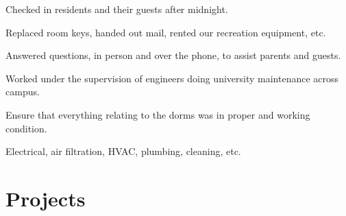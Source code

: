 \documentclass[]{latex/resume}
\begin{document}
\begin{minipage}[t]{0.75\textwidth}
    \sectionsep

     
    \begin{tightemize}
        \sectionsep
            \item Checked in residents and their guests after midnight.
            \item Replaced room keys, handed out mail, rented our recreation equipment, etc.
            \item Answered questions, in person and over the phone, to assist parents and guests.
        \end{tightemize}

    \sectionsep

         
        \begin{tightemize}
            \sectionsep
                \item Worked under the supervision of engineers doing university maintenance across campus.
                \item Ensure that everything relating to the dorms was in proper and working condition.
                \item Electrical, air filtration, HVAC, plumbing, cleaning, etc.
            \end{tightemize}
            
    \sectionsep

    



\section{Projects}


\end{minipage}
\end{document}
